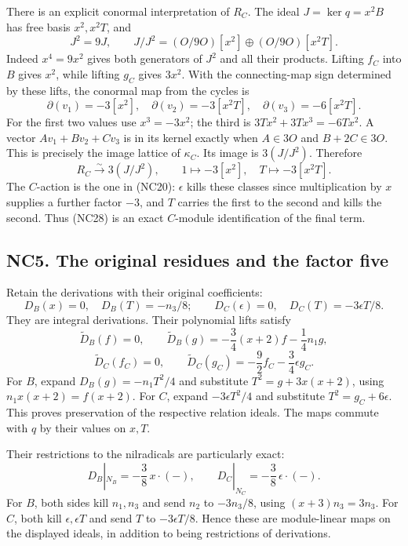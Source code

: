 \documentclass[
  10pt,
]{article}
\begin{document}
There is an explicit conormal interpretation of \(R_C\). The ideal
\(J=\ker q=x^2B\) has free basis \(x^2,x^2T\), and \[
J^2=9J,\qquad J/J^2=(O/9O)[x^2]\oplus(O/9O)[x^2T].
\tag{NC26}
\] Indeed \(x^4=9x^2\) gives both generators of \(J^2\) and all their
products. Lifting \(f_C\) into \(B\) gives \(x^2\), while lifting
\(g_C\) gives \(3x^2\). With the connecting-map sign determined by these
lifts, the conormal map from the cycles is \[
\partial(v_1)=-3[x^2],\quad
\partial(v_2)=-3[x^2T],\quad
\partial(v_3)=-6[x^2T].
\tag{NC27}
\] For the first two values use \(x^3=-3x^2\); the third is
\(3Tx^2+3Tx^3=-6Tx^2\). A vector \(Av_1+Bv_2+Cv_3\) is in its kernel
exactly when \(A\in3O\) and \(B+2C\in3O\). This is precisely the image
lattice of \(\kappa_C\). Its image is \(3(J/J^2)\). Therefore \[
R_C\xrightarrow{\sim}3(J/J^2),\qquad
1\mapsto-3[x^2],\quad T\mapsto-3[x^2T].
\tag{NC28}
\] The \(C\)-action is the one in (NC20): \(\epsilon\) kills these
classes since multiplication by \(x\) supplies a further factor \(-3\),
and \(T\) carries the first to the second and kills the second. Thus
(NC28) is an exact \(C\)-module identification of the final term.

\subsection{NC5. The original residues and the factor
five}\label{nc5.-the-original-residues-and-the-factor-five}

Retain the derivations with their original coefficients: \[
D_B(x)=0,\quad D_B(T)=-n_3/8;\qquad
D_C(\epsilon)=0,\quad D_C(T)=-3\epsilon T/8.
\tag{NC29}
\] They are integral derivations. Their polynomial lifts satisfy \[
\widetilde D_B(f)=0,\qquad
\widetilde D_B(g)=-\frac34(x+2)f-\frac14n_1g,
\] \[
\widetilde D_C(f_C)=0,\qquad
\widetilde D_C(g_C)=-\frac92f_C-\frac34\epsilon g_C.
\tag{NC30}
\] For \(B\), expand \(D_B(g)=-n_1T^2/4\) and substitute
\(T^2=g+3x(x+2)\), using \(n_1x(x+2)=f(x+2)\). For \(C\), expand
\(-3\epsilon T^2/4\) and substitute \(T^2=g_C+6\epsilon\). This proves
preservation of the respective relation ideals. The maps commute with
\(q\) by their values on \(x,T\).

Their restrictions to the nilradicals are particularly exact: \[
D_B|_{N_B}=-\frac38\,x\cdot(-),\qquad
D_C|_{N_C}=-\frac38\,\epsilon\cdot(-).
\tag{NC31}
\] For \(B\), both sides kill \(n_1,n_3\) and send \(n_2\) to
\(-3n_3/8\), using \((x+3)n_3=3n_3\). For \(C\), both kill
\(\epsilon,\epsilon T\) and send \(T\) to \(-3\epsilon T/8\). Hence
these are module-linear maps on the displayed ideals, in addition to
being restrictions of derivations.
\end{document}
